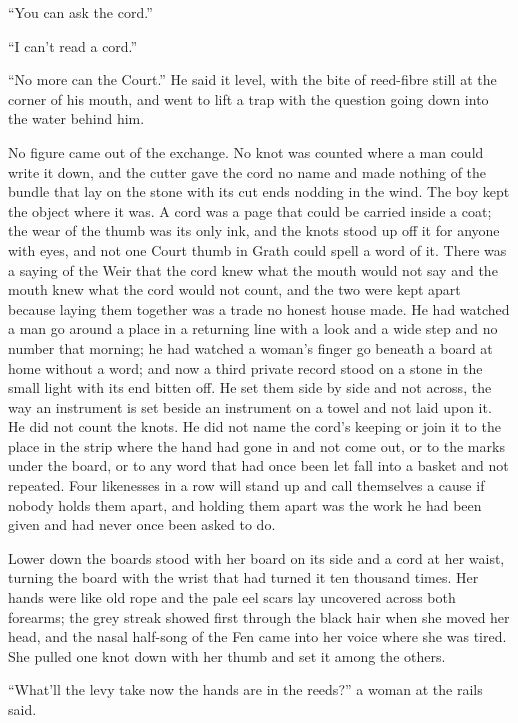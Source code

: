 “You can ask the cord.”

“I can't read a cord.”

“No more can the Court.” He said it level, with the bite of reed-fibre still at the corner of his mouth, and went to lift a trap with the question going down into the water behind him.

No figure came out of the exchange. No knot was counted where a man could write it down, and the cutter gave the cord no name and made nothing of the bundle that lay on the stone with its cut ends nodding in the wind. The boy kept the object where it was. A cord was a page that could be carried inside a coat; the wear of the thumb was its only ink, and the knots stood up off it for anyone with eyes, and not one Court thumb in Grath could spell a word of it. There was a saying of the Weir that the cord knew what the mouth would not say and the mouth knew what the cord would not count, and the two were kept apart because laying them together was a trade no honest house made. He had watched a man go around a place in a returning line with a look and a wide step and no number that morning; he had watched a woman's finger go beneath a board at home without a word; and now a third private record stood on a stone in the small light with its end bitten off. He set them side by side and not across, the way an instrument is set beside an instrument on a towel and not laid upon it. He did not count the knots. He did not name the cord's keeping or join it to the place in the strip where the hand had gone in and not come out, or to the marks under the board, or to any word that had once been let fall into a basket and not repeated. Four likenesses in a row will stand up and call themselves a cause if nobody holds them apart, and holding them apart was the work he had been given and had never once been asked to do.

\scenebreak

Lower down the boards  stood with her board on its side and a cord at her waist, turning the board with the wrist that had turned it ten thousand times. Her hands were like old rope and the pale eel scars lay uncovered across both forearms; the grey streak showed first through the black hair when she moved her head, and the nasal half-song of the Fen came into her voice where she was tired. She pulled one knot down with her thumb and set it among the others.

“What'll the levy take now the hands are in the reeds?” a woman at the rails said.

